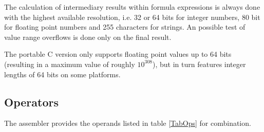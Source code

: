 \documentclass[12pt,twoside]{report}
\begin{document}
The calculation of intermediary results within formula expressions is
always done with the highest available resolution, i.e. 32 or 64 bits for
integer numbers, 80 bit for floating point numbers and 255 characters
for strings.  An possible test of value range overflows is done only
on the final result.

The portable C version  only supports floating
point values up to 64 bits (resulting in a maximum value of roughly
$10^{308}$), but in turn features integer lengths of 64 bits on some
platforms.

\subsection{Operators}

The assembler provides the operands listed in table \ref{TabOps} for
combination.
\end{document}
